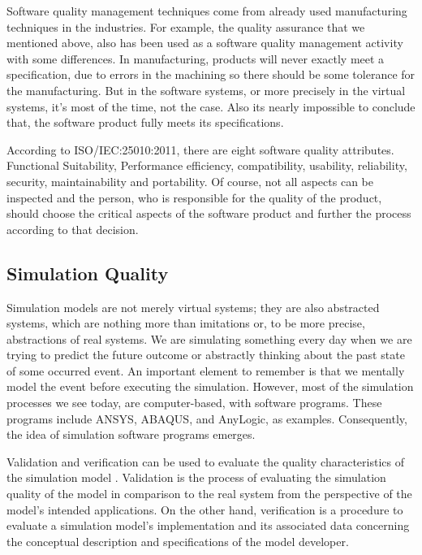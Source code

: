 \documentclass{llncs}
\begin{document}
    Software quality management techniques come from already used manufacturing techniques in the industries.
    For example, the quality assurance that we mentioned above, also has been used as a software quality management activity with some differences. 
    In manufacturing, products will never exactly meet a specification, due to errors in the machining so there should be some tolerance for the manufacturing. 
    But in the software systems, or more precisely in the virtual systems, it's most of the time, not the case. 
    Also its nearly impossible to conclude that, the software product fully meets its specifications\cite{SoftwareEngineering}.

    According to ISO/IEC:25010:2011, there are eight software quality attributes. Functional Suitability, 
    Performance efficiency, compatibility, usability, reliability, security, maintainability and portability.\cite{ISO/IEC:25010}
    Of course, not all aspects can be inspected and the person, who is responsible for the quality of the product, should choose the critical aspects of the software product and further the process according to that decision.

    \subsection*{Simulation Quality}
    Simulation models are not merely virtual systems; they are also abstracted systems, which are nothing more than imitations or, to be more precise, abstractions of real systems. 
    We are simulating something every day when we are trying to predict the future outcome or abstractly thinking about the past state of some occurred event. 
    An important element to remember is that we mentally model the event before executing the simulation. However, most of the simulation processes we see today, 
    are computer-based, with software programs. These programs include ANSYS\cite{Ansys}, ABAQUS\cite{Abaqus}, and AnyLogic\cite{AnyLogic}, as examples. Consequently, the idea of simulation software programs emerges.

    Validation and verification can be used to evaluate the quality characteristics of the simulation model \cite{StewartSimulation} \cite{VerificationValidationSergent} \cite{OsmanBalci}. 
    Validation is the process of evaluating the simulation quality of the model in comparison to the real system from the perspective of the model's intended applications. 
    On the other hand, verification is a procedure to evaluate a simulation model's implementation and its associated data concerning the conceptual description and specifications of the model developer. 
\end{document}
